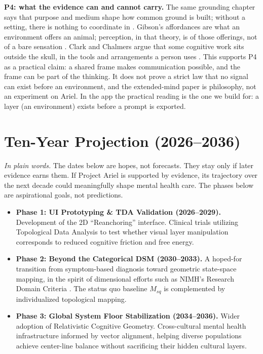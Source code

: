 \documentclass[11pt]{article}
\begin{document}
\textbf{P4: what the evidence can and cannot carry.}
The same grounding chapter says that purpose and medium shape how common ground is built; without a setting, there is nothing to coordinate in \cite{clarkbrennan}. Gibson's affordances are what an environment offers an animal; perception, in that theory, is of those offerings, not of a bare sensation \cite{gibson}. Clark and Chalmers argue that some cognitive work sits outside the skull, in the tools and arrangements a person uses \cite{extended}. This supports P4 as a practical claim: a shared frame makes communication possible, and the frame can be part of the thinking. It does not prove a strict law that no signal can exist before an environment, and the extended-mind paper is philosophy, not an experiment on Ariel. In the app the practical reading is the one we build for: a layer (an environment) exists before a prompt is exported.

\section{Ten-Year Projection (2026--2036)}
\textit{In plain words.} The dates below are hopes, not forecasts. They stay only if later evidence earns them.
If Project Ariel is supported by evidence, its trajectory over the next decade could meaningfully shape mental health care. The phases below are aspirational goals, not predictions.
\begin{itemize}[leftmargin=1.2em]
\item \textbf{Phase 1: UI Prototyping \& TDA Validation (2026--2029).} Development of the 2D ``Reanchoring'' interface. Clinical trials utilizing Topological Data Analysis to test whether visual layer manipulation corresponds to reduced cognitive friction and free energy.
\item \textbf{Phase 2: Beyond the Categorical DSM (2030--2033).} A hoped-for transition from symptom-based diagnosis toward geometric state-space mapping, in the spirit of dimensional efforts such as NIMH's Research Domain Criteria \cite{rdoc}. The status quo baseline $M_{sq}$ is complemented by individualized topological mapping.
\item \textbf{Phase 3: Global System Floor Stabilization (2034--2036).} Wider adoption of Relativistic Cognitive Geometry. Cross-cultural mental health infrastructure informed by vector alignment, helping diverse populations achieve center-line balance without sacrificing their hidden cultural layers.
\end{itemize}
\end{document}
